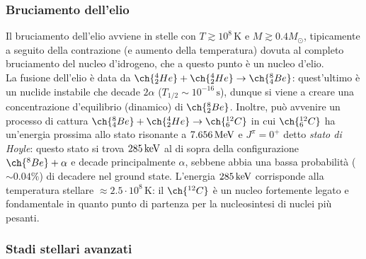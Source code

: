 \subsubsection{Bruciamento dell'elio}

Il bruciamento dell'elio avviene in stelle con $ T \gtrsim 10^8 \,\text{K} $ e $ M \gtrsim 0.4 M_\odot $, tipicamente a seguito della contrazione (e aumento della temperatura) dovuta al completo bruciamento del nucleo d'idrogeno, che a questo punto è un nucleo d'elio.\\
La fusione dell'elio è data da $ \ch{^4_2 He} + \ch{^4_2 He} \rightarrow \ch{^8_4 Be} $: quest'ultimo è un nuclide instabile che decade $ 2\alpha $ ($ T_{1/2} \sim 10^{-16}\,\text{s} $), dunque si viene a creare una concentrazione d'equilibrio (dinamico) di $ \ch{^8_2 Be} $. Inoltre, può avvenire un processo di cattura $ \ch{^8_4 Be} + \ch{^4_2 He} \rightarrow \ch{^{12}_6 C} $ in cui $ \ch{^{12}_6 C} $ ha un'energia prossima allo stato risonante a $ 7.656\,\mathrm{MeV} $ e $ J^\pi = 0^+ $ detto \textit{stato di Hoyle}: questo stato si trova $ 285\,\mathrm{keV} $ al di sopra della configurazione $ \ch{^8 Be} + \alpha $ e decade principalmente $ \alpha $, sebbene abbia una bassa probabilità ($ \sim 0.04\% $) di decadere nel ground state. L'energia $ 285\,\mathrm{keV} $ corrisponde alla temperatura stellare $ \approx 2.5 \cdot 10^8 \,\text{K} $: il $ \ch{^{12} C} $ è un nucleo fortemente legato e fondamentale in quanto punto di partenza per la nucleosintesi di nuclei più pesanti.

\subsubsection{Stadi stellari avanzati}

